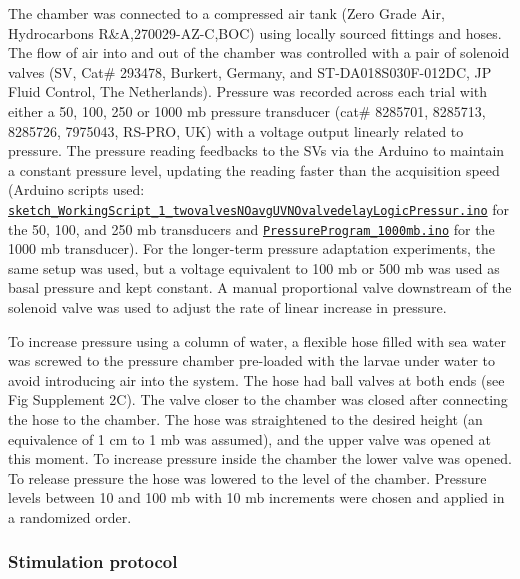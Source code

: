 \documentclass[
]{article}
\begin{document}
The chamber was connected to a compressed air tank (Zero Grade Air,
Hydrocarbons R\&A,270029-AZ-C,BOC) using locally sourced fittings and
hoses. The flow of air into and out of the chamber was controlled with a
pair of solenoid valves (SV, Cat\# 293478, Burkert, Germany, and
ST-DA018S030F-012DC, JP Fluid Control, The Netherlands). Pressure was
recorded across each trial with either a 50, 100, 250 or 1000 mb
pressure transducer (cat\# 8285701, 8285713, 8285726, 7975043, RS-PRO,
UK) with a voltage output linearly related to pressure. The pressure
reading feedbacks to the SVs via the Arduino to maintain a constant
pressure level, updating the reading faster than the acquisition speed
(Arduino scripts used:
\href{https://github.com/JekelyLab/Bezares_et_al_2023_Pressure/blob/main/Code/PressureControl/sketch_WorkingScript_1_twovalvesNOavgUVNOvalvedelayLogicPressur/sketch_WorkingScript_1_twovalvesNOavgUVNOvalvedelayLogicPressur.ino}{\texttt{sketch\_WorkingScript\_1\_twovalvesNOavgUVNOvalvedelayLogicPressur.ino}}
for the 50, 100, and 250 mb transducers and
\href{https://github.com/JekelyLab/Bezares_et_al_2023_Pressure/blob/main/Code/PressureControl/PressureProgram_1000mb/PressureProgram_1000mb.ino}{\texttt{PressureProgram\_1000mb.ino}}
for the 1000 mb transducer). For the longer-term pressure adaptation
experiments, the same setup was used, but a voltage equivalent to 100 mb
or 500 mb was used as basal pressure and kept constant. A manual
proportional valve downstream of the solenoid valve was used to adjust
the rate of linear increase in pressure.

To increase pressure using a column of water, a flexible hose filled
with sea water was screwed to the pressure chamber pre-loaded with the
larvae under water to avoid introducing air into the system. The hose
had ball valves at both ends (see Fig Supplement 2C). The valve closer
to the chamber was closed after connecting the hose to the chamber. The
hose was straightened to the desired height (an equivalence of 1 cm to 1
mb was assumed), and the upper valve was opened at this moment. To
increase pressure inside the chamber the lower valve was opened. To
release pressure the hose was lowered to the level of the chamber.
Pressure levels between 10 and 100 mb with 10 mb increments were chosen
and applied in a randomized order.

\hypertarget{stimulation-protocol}{%
\subsubsection{Stimulation protocol}\label{stimulation-protocol}}
\end{document}
